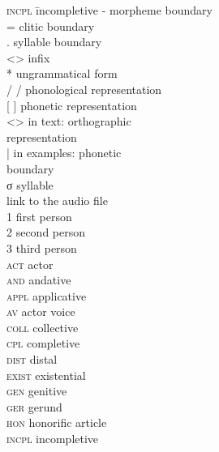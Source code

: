 \label{abb}


\begin{multicols}{2}
\begin{tabbing}
\textsc{incpl} \hspace{.5em} \=  incompletive     \kill
-                    \>  morpheme boundary           \\
=                     \>  clitic boundary             \\
.                         \>  syllable boundary           \\
<>                         \>  infix          \\
*                         \>  ungrammatical form          \\
/ /                       \>  phonological representation \\
{[} {]}                   \>  phonetic representation     \\
\textless \textgreater{}  \>  in text: orthographic \\ \> representation  \\
|                         \>  in examples: phonetic \\ \> boundary \\
σ \> syllable \\
\triangleright \>  link to the audio file\footnotemark\\
1               \>  first person     \\
2               \>  second person    \\
3               \>  third person     \\
\textsc{act}    \>  actor            \\
\textsc{and}    \>  andative         \\
\textsc{appl}   \>  applicative      \\
\textsc{av}     \>  actor voice      \\
\textsc{coll}   \>  collective       \\
\textsc{cpl}    \>  completive       \\
\textsc{dist}   \>  distal           \\
\textsc{exist}  \>  existential      \\
\textsc{gen}    \>  genitive         \\
\textsc{ger}    \>  gerund           \\
\textsc{hon}    \>  honorific article\\
\textsc{incpl}  \>  incompletive     \\

\end{tabbing}
\end{multicols}
